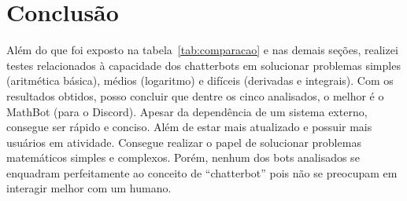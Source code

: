 \section{Conclusão}\label{sec:conclusao} %

Além do que foi exposto na tabela~\ref{tab:comparacao} e nas demais seções, realizei testes relacionados à capacidade
dos chatterbots em solucionar problemas simples (aritmética básica), médios (logaritmo) e difíceis (derivadas e integrais). Com os resultados obtidos, posso concluir que dentre os cinco analisados, o melhor é o MathBot (para o Discord). Apesar da dependência de um sistema externo, consegue ser rápido e conciso. Além de estar mais atualizado e possuir mais usuários em atividade. Consegue realizar o papel de solucionar problemas matemáticos simples e complexos. Porém, nenhum dos bots analisados se enquadram perfeitamente ao conceito de ``chatterbot'' pois não se preocupam em interagir melhor com um humano.